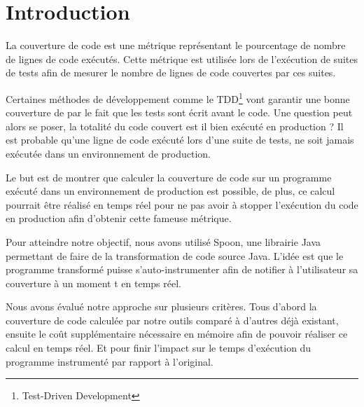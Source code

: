 \chapter*{Introduction}
	\thispagestyle{introduction}

La couverture de code est une métrique représentant le pourcentage de nombre de lignes de code exécutés. Cette métrique est utilisée lors de l'exécution de suites de tests afin de mesurer le nombre de lignes de code couvertes par ces suites. 

Certaines méthodes de développement comme le TDD\footnote{Test-Driven Development} vont garantir une bonne couverture de par le fait que les tests sont écrit avant le code. Une question peut alors se poser, la totalité du code couvert est il bien exécuté en production ? Il est probable qu’une ligne de code exécuté lors d’une suite de tests, ne soit jamais exécutée dans un environnement de production. 

Le but est de montrer que calculer la couverture de code sur un programme exécuté dans un environnement de production est possible, de plus, ce calcul pourrait être réalisé en temps réel pour ne pas avoir à stopper l’exécution du code en production afin d’obtenir cette fameuse métrique.

Pour atteindre notre objectif, nous avons utilisé Spoon, une librairie Java permettant de faire de la transformation de code source Java. L’idée est que le programme transformé puisse s’auto-instrumenter afin de notifier à l’utilisateur sa couverture à un moment t en temps réel.

Nous avons évalué notre approche sur plusieurs critères. Tous d’abord la couverture de code calculée par notre outils comparé à d’autres déjà existant, ensuite le coût supplémentaire nécessaire en mémoire afin de pouvoir réaliser ce calcul en temps réel. Et pour finir l’impact sur le temps d’exécution du programme instrumenté par rapport à l’original.

